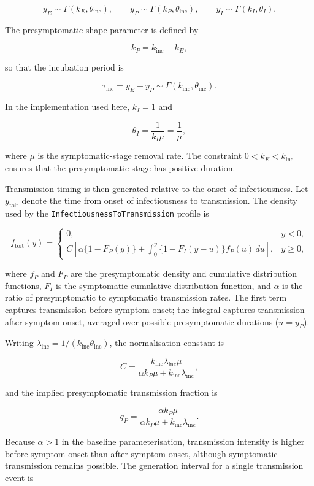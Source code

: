 \[
	y_E \sim \Gamma(k_E,\theta_{\mathrm{inc}}),
	\qquad
	y_P \sim \Gamma(k_P,\theta_{\mathrm{inc}}),
	\qquad
	y_I \sim \Gamma(k_I,\theta_I).
\]

The presymptomatic shape parameter is defined by

\[
	k_P = k_{\mathrm{inc}} - k_E,
\]

so that the incubation period is

\[
	\tau_{\mathrm{inc}} = y_E + y_P
	\sim \Gamma(k_{\mathrm{inc}},\theta_{\mathrm{inc}}).
\]

In the implementation used here, $k_I=1$ and

\[
	\theta_I = \frac{1}{k_I\mu} = \frac{1}{\mu},
\]

where $\mu$ is the symptomatic-stage removal rate. The constraint $0 < k_E < k_{\mathrm{inc}}$ ensures that the presymptomatic stage has positive duration.

Transmission timing is then generated relative to the onset of infectiousness. Let $y_{\mathrm{toit}}$ denote the time from onset of infectiousness to transmission. The density used by the \texttt{InfectiousnessToTransmission} profile is \citep{Hart2021}

\[
	f_{\mathrm{toit}}(y) =
	\begin{cases}
		0, & y < 0, \\[6pt]
		C\!\left[
			\alpha\{1 - F_P(y)\}
			+ \displaystyle\int_0^y
			\{1 - F_I(y - u)\} f_P(u)\,du
		\right], & y \ge 0,
	\end{cases}
\]

where $f_P$ and $F_P$ are the presymptomatic density and cumulative distribution functions, $F_I$ is the symptomatic cumulative distribution function, and $\alpha$ is the ratio of presymptomatic to symptomatic transmission rates. The first term captures transmission before symptom onset; the integral captures transmission after symptom onset, averaged over possible presymptomatic durations ($u = y_P$).

Writing $\lambda_{\mathrm{inc}} = 1/(k_{\mathrm{inc}}\theta_{\mathrm{inc}})$, the normalisation constant is

\[
	C =
	\frac{k_{\mathrm{inc}}\lambda_{\mathrm{inc}}\mu}
	{\alpha k_P \mu + k_{\mathrm{inc}}\lambda_{\mathrm{inc}}},
\]

and the implied presymptomatic transmission fraction is

\[
	q_P =
	\frac{\alpha k_P \mu}
	{\alpha k_P \mu + k_{\mathrm{inc}}\lambda_{\mathrm{inc}}}.
\]

Because $\alpha > 1$ in the baseline parameterisation, transmission intensity is higher before symptom onset than after symptom onset, although symptomatic transmission remains possible. The generation interval for a single transmission event is

